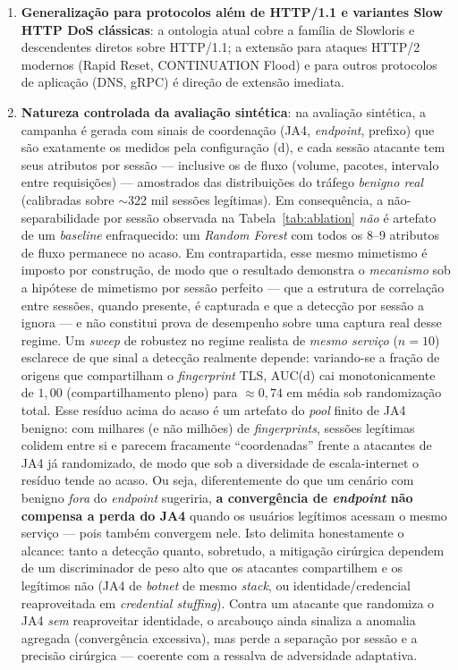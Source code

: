 \documentclass[preprint,12pt]{elsarticle}
\begin{document}
\begin{enumerate}
    \item \textbf{Generalização para protocolos além de HTTP/1.1 e variantes Slow HTTP DoS clássicas}: a ontologia atual cobre a família de Slowloris e descendentes diretos sobre HTTP/1.1; a extensão para ataques HTTP/2 modernos (Rapid Reset, CONTINUATION Flood) e para outros protocolos de aplicação (DNS, gRPC) é direção de extensão imediata.

    \item \textbf{Natureza controlada da avaliação sintética}: na avaliação sintética, a campanha é gerada com sinais de coordenação (JA4, \emph{endpoint}, prefixo) que são exatamente os medidos pela configuração (d), e cada sessão atacante tem seus atributos por sessão --- inclusive os de fluxo (volume, pacotes, intervalo entre requisições) --- amostrados das distribuições do tráfego \emph{benigno real} (calibradas sobre $\sim$322 mil sessões legítimas). Em consequência, a não-separabilidade por sessão observada na Tabela~\ref{tab:ablation} \emph{não} é artefato de um \emph{baseline} enfraquecido: um \emph{Random Forest} com todos os 8--9 atributos de fluxo permanece no acaso. Em contrapartida, esse mesmo mimetismo é imposto por construção, de modo que o resultado demonstra o \emph{mecanismo} sob a hipótese de mimetismo por sessão perfeito --- que a estrutura de correlação entre sessões, quando presente, é capturada e que a detecção por sessão a ignora --- e não constitui prova de desempenho sobre uma captura real desse regime. Um \emph{sweep} de robustez no regime realista de \emph{mesmo serviço} ($n=10$) esclarece de que sinal a detecção realmente depende: variando-se a fração de origens que compartilham o \emph{fingerprint} TLS, AUC(d) cai monotonicamente de $1{,}00$ (compartilhamento pleno) para $\approx 0{,}74$ em média sob randomização total. Esse resíduo acima do acaso é um artefato do \emph{pool} finito de JA4 benigno: com milhares (e não milhões) de \emph{fingerprints}, sessões legítimas colidem entre si e parecem fracamente ``coordenadas'' frente a atacantes de JA4 já randomizado, de modo que sob a diversidade de escala-internet o resíduo tende ao acaso. Ou seja, diferentemente do que um cenário com benigno \emph{fora} do \emph{endpoint} sugeriria, \textbf{a convergência de \emph{endpoint} não compensa a perda do JA4} quando os usuários legítimos acessam o mesmo serviço --- pois também convergem nele. Isto delimita honestamente o alcance: tanto a detecção quanto, sobretudo, a mitigação cirúrgica dependem de um discriminador de peso alto que os atacantes compartilhem e os legítimos não (JA4 de \emph{botnet} de mesmo \emph{stack}, ou identidade/credencial reaproveitada em \emph{credential stuffing}). Contra um atacante que randomiza o JA4 \emph{sem} reaproveitar identidade, o arcabouço ainda sinaliza a anomalia agregada (convergência excessiva), mas perde a separação por sessão e a precisão cirúrgica --- coerente com a ressalva de adversidade adaptativa.


\end{enumerate}
\end{document}
